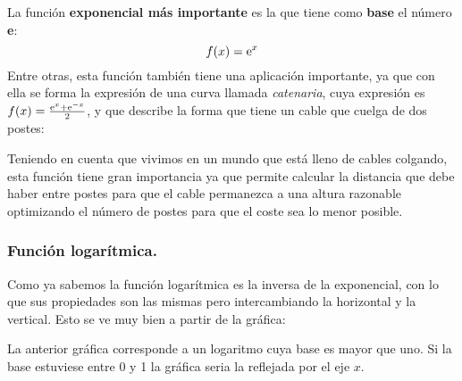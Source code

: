 \documentclass[a4paper,11pt,answers]{exam}
\begin{document}
La función \textbf{exponencial más importante} es la que tiene como \textbf{base} el número \textbf{e}:
\[f(x) = \mathrm{e}^x\]
Entre otras, esta función también tiene una aplicación importante, ya que con ella se forma la expresión de una curva llamada \textit{catenaria}, cuya expresión es $f(x) = \frac{\mathrm{e}^x + \mathrm{e}^{-x}}{2}$, y que describe la forma que tiene un cable que cuelga de dos postes:
\begin{center}
\end{center}
Teniendo en cuenta que vivimos en un mundo que está lleno de cables colgando, esta función tiene gran importancia ya que permite calcular la distancia que debe haber entre postes para que el cable permanezca a una altura razonable optimizando el número de postes para que el coste sea lo menor posible.\\
\subsubsection{Función logarítmica.}
Como ya sabemos la función logarítmica es la inversa de la exponencial, con lo que sus propiedades son las mismas pero intercambiando la horizontal y la vertical. Esto se ve muy bien a partir de la gráfica:
\begin{center}
\end{center}
La anterior gráfica corresponde a un logaritmo cuya base es mayor que uno. Si la base estuviese entre 0 y 1 la gráfica seria la reflejada por el eje $x$.\\
\end{document}
